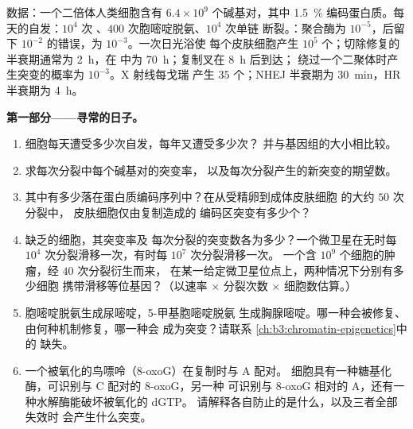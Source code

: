 \begin{problem}
\label{pb:b3:dna-repair:1}
数据：一个二倍体人类细胞含有 $6.4\times 10^{9}$ 个碱基对，其中 \qty{1.5}{\%}
编码蛋白质。每天的自发：$10^{4}$ 次
、$400$ 次胞嘧啶脱氨、$10^{4}$ 次单链
断裂。：聚合酶为 $10^{-5}$，后留下
$10^{-2}$ 的错误，为 $10^{-3}$。一次日光浴使
每个皮肤细胞产生 $10^{5}$ 个；切除修复的
半衰期通常为 \qty{2}{h}，在
中为 \qty{70}{h}；复制叉在 \qty{8}{h} 后到达；
绕过一个二聚体时产生突变的概率为 $10^{-3}$。X 射线每戈瑞
产生 $35$ 个；NHEJ 半衰期为 \qty{30}{min}，HR
半衰期为 \qty{4}{h}。

\medskip
\noindent\textbf{第一部分——寻常的日子。}
\begin{enumerate}
  \item 细胞每天遭受多少次自发，每年又遭受多少次？
        并与基因组的大小相比较。
  \item 求每次分裂中每个碱基对的突变率，
        以及每次分裂产生的新突变的期望数。
  \item 其中有多少落在蛋白质编码序列中？在从受精卵到成体皮肤细胞
        的大约 $50$ 次分裂中，
        皮肤细胞仅由复制造成的
        编码区突变有多少个？
  \item 缺乏的细胞，其突变率及
        每次分裂的突变数各为多少？一个微卫星在无时每 $10^{4}$
        次分裂滑移一次，有时每 $10^{7}$ 次分裂滑移一次。
        一个含 $10^{9}$ 个细胞的肿瘤，经 $40$ 次分裂衍生而来，
        在某一给定微卫星位点上，两种情况下分别有多少细胞
        携带滑移等位基因？（以速率 $\times$
        分裂次数 $\times$ 细胞数估算。）
  \item 胞嘧啶脱氨生成尿嘧啶，5-甲基胞嘧啶脱氨
        生成胸腺嘧啶。哪一种会被修复、由何种机制修复，哪一种会
        成为突变？请联系
        \cref{ch:b3:chromatin-epigenetics}中的  缺失。
  \item 一个被氧化的鸟嘌呤（8-oxoG）在复制时与 A 配对。
        细胞具有一种糖基化酶，可识别与 C 配对的 8-oxoG，另一种
        可识别与 8-oxoG 相对的 A，还有一种水解酶能破坏被氧化的 dGTP。
        请解释各自防止的是什么，以及三者全部失效时
        会产生什么突变。
\end{enumerate}


\end{problem}
